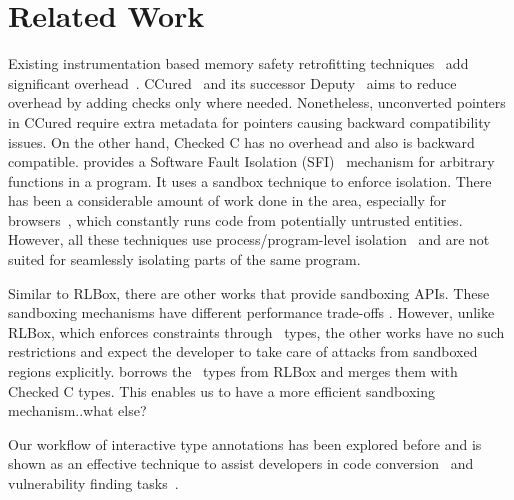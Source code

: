 \section{Related Work}
Existing instrumentation based memory safety retrofitting techniques~\cite{duck2016heap,serebryany2012addresssanitizer,
  nagarakatte2009softbound,kendall1983bcc,steffen1992adding} add significant overhead~\cite{duck2016heap,serebryany2012addresssanitizer,
  nagarakatte2009softbound,kendall1983bcc,steffen1992adding}.
CCured~\cite{necula2005ccured}  and its successor Deputy~\cite{condit2007dependent}
aims to reduce overhead by adding checks only where
needed.
Nonetheless, unconverted pointers in CCured require extra metadata for pointers causing backward compatibility issues.
On the other hand, Checked C has no overhead and also is backward compatible.
\systemname provides a Software Fault Isolation (SFI)~\cite{tan2017principles} mechanism for arbitrary functions in a program.
It uses a sandbox technique to enforce isolation.
There has been a considerable amount of work done in the area, especially for browsers~\cite{minsfi,barth-et-al:chromium:08, site-isolation-usenix}, which constantly runs code from potentially untrusted entities.
However, all these techniques use process/program-level isolation~\cite{site-isolation-usenix} and are not suited for seamlessly isolating parts of the same program.

Similar to RLBox, there are other works that provide sandboxing APIs.
These sandboxing mechanisms have different performance trade-offs \cite{wahbe-et-al:sfi:sosp93, nacl-amd64, minsfi, wasm,erim, tan-sfi-survey, shu-isolation-survey}. 
However, unlike RLBox, which enforces constraints 
through~ types, the other works have no such restrictions and expect the developer to take care of attacks from sandboxed regions explicitly.
\systemname borrows the~ types from RLBox and merges them with Checked C types.
This enables us to have a more efficient sandboxing mechanism..what else?

Our workflow of interactive type annotations has been explored before and is shown as an effective technique to assist developers in code conversion~\cite{machiry2022c} and vulnerability finding tasks~\cite{naik2021sporq}.